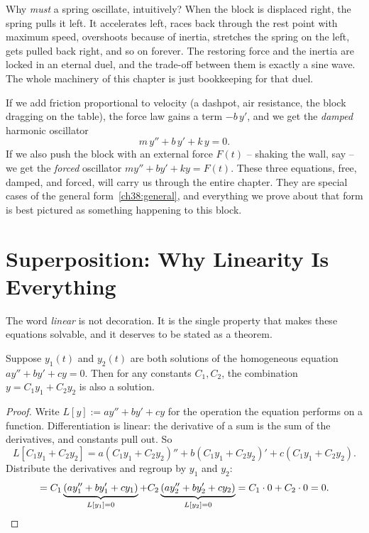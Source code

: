 \begin{intuitionbox}
Why \emph{must} a spring oscillate, intuitively? When the block is displaced
right, the spring pulls it left. It accelerates left, races back through the rest
point with maximum speed, overshoots because of inertia, stretches the spring on
the left, gets pulled back right, and so on forever. The restoring force and the
inertia are locked in an eternal duel, and the trade-off between them is exactly
a sine wave. The whole machinery of this chapter is just bookkeeping for that
duel.
\end{intuitionbox}

If we add friction proportional to velocity (a dashpot, air resistance, the
block dragging on the table), the force law gains a term $-b\,y'$, and we get the
\emph{damped} harmonic oscillator
\begin{equation}
  m\,y'' + b\,y' + k\,y = 0.
  \label{ch38:damped}
\end{equation}
If we also push the block with an external force $F(t)$ -- shaking the wall,
say -- we get the \emph{forced} oscillator $m y'' + b y' + k y = F(t)$. These
three equations, free, damped, and forced, will carry us through the entire
chapter. They are special cases of the general form~\eqref{ch38:general}, and
everything we prove about that form is best pictured as something happening to
this block.

\section{Superposition: Why Linearity Is Everything}
\label{ch38:superposition}

The word \emph{linear} is not decoration. It is the single property that makes
these equations solvable, and it deserves to be stated as a theorem.

\begin{theorem}
\label{ch38:thm-superposition}
Suppose $y_1(t)$ and $y_2(t)$ are both solutions of the homogeneous equation
$a y'' + b y' + c y = 0$. Then for any constants $C_1, C_2$, the combination
$y = C_1 y_1 + C_2 y_2$ is also a solution.
\end{theorem}

\begin{proof}
Write $L[y] := a y'' + b y' + c y$ for the operation the equation performs on a
function. Differentiation is linear: the derivative of a sum is the sum of the
derivatives, and constants pull out. So
\[
  L[C_1 y_1 + C_2 y_2]
  = a(C_1 y_1 + C_2 y_2)'' + b(C_1 y_1 + C_2 y_2)' + c(C_1 y_1 + C_2 y_2).
\]
Distribute the derivatives and regroup by $y_1$ and $y_2$:
\[
  = C_1\underbrace{(a y_1'' + b y_1' + c y_1)}_{L[y_1] = 0}
  + C_2\underbrace{(a y_2'' + b y_2' + c y_2)}_{L[y_2] = 0}
  = C_1\cdot 0 + C_2 \cdot 0 = 0. \qedhere
\]
\end{proof}

